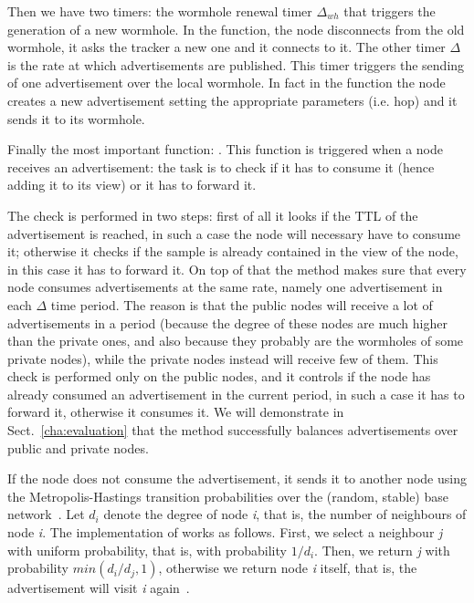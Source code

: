 Then we have two timers: the wormhole renewal timer $\Delta_{wh}$ that triggers the generation of a new wormhole. In the function, the node disconnects from the old wormhole, it asks the tracker a new one and it connects to it. The other timer $\Delta$ is the rate at which advertisements are published. This timer triggers the sending of one advertisement over the local wormhole. In fact in the function the node creates a new advertisement setting the appropriate parameters (i.e. hop) and it sends it to its wormhole.

Finally the most important function: \receivedAd. This function is triggered when a node receives an advertisement: the task is to check if it has to consume it (hence adding it to its view) or it has to forward it. 

The check is performed in two steps: first of all it looks if the TTL of the advertisement is reached, in such a case the node will necessary have to consume it; otherwise it checks if the sample is already contained in the view of the node, in this case it has to forward it. On top of that the \acceptAd method makes sure that every node consumes advertisements at the same rate, namely one advertisement in each $\Delta$ time period. The reason is that the public nodes will receive a lot of advertisements in a period (because the degree of these nodes are much higher than the private ones, and also because they probably are the wormholes of some private nodes), while the private nodes instead will receive few of them. This check is performed only on the public nodes, and it controls if the node has already consumed an advertisement in the current period, in such a case it has to forward it, otherwise it consumes it. We will demonstrate in Sect.~\ref{cha:evaluation} that the \acceptAd method successfully balances advertisements over public and private nodes.

If the node does not consume the advertisement, it sends it to another node using the Metropolis-Hastings transition probabilities over the (random, stable) base network~\cite{metropolis}.  Let $d_i$ denote the degree of node \textit{i}, that is, the number of neighbours of node \textit{i}. The implementation of \getMetropolisHastingsNeighbour works as follows. First, we select a neighbour \textit{j} with uniform probability, that is, with probability $1/d_i$. Then, we return \textit{j} with probability $min(d_i /d_j , 1)$, otherwise we return node \textit{i} itself, that is, the advertisement will visit \textit{i} again~\cite{wormhole}.
